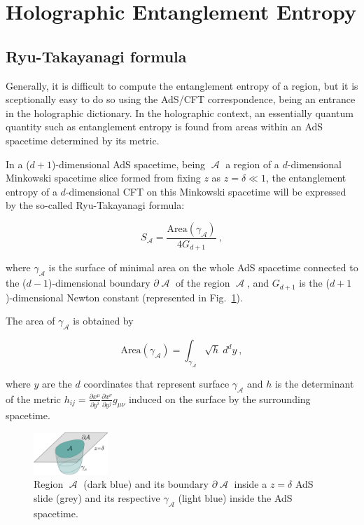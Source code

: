 \documentclass[twocolumn]{revtex4}
\providecommand{\eq}[2]{
    \begin{equation}
        #2
    \label{eq:#1}
    \end{equation}
}
\DeclareMathOperator{\calA}{\mathcal{A}}
\begin{document}
\section{Holographic Entanglement Entropy} \label{s:EE_Holo}


\subsection{Ryu-Takayanagi formula} \label{ss:R-T}

Generally, it is difficult to compute the entanglement entropy of a region, but it is sceptionally easy to do so using the AdS/CFT correspondence, being an entrance in the holographic dictionary. In the holographic context, an essentially quantum quantity such as entanglement entropy is found from areas within an AdS spacetime determined by its metric.

In a ($d+1$)-dimensional AdS spacetime, being $\calA$ a region of a $d$-dimensional Minkowski spacetime slice formed from fixing $z$ as $z=\delta \ll 1$, the entanglement entropy of a $d$-dimensional CFT on this Minkowski spacetime will be expressed by the so-called Ryu-Takayanagi formula:
\eq{EE_RT}{
    S_{\calA} = \frac{ \text{Area}(\gamma_{\calA}) }{ 4 G_{d+1} } \ ,
}
\cite{ryu_holographic_2008} where $\gamma_{\calA}$ is the surface of minimal area on the whole AdS spacetime connected to the ($d-1$)-dimensional boundary $\partial \calA$ of the region $\calA$, and $G_{d+1}$ is the ($d+1$)-dimensional Newton constant (represented in Fig.~\ref{fig:EE_AdS-CFT}).

The area of $\gamma_{\calA}$ is obtained by
\eq{EE_RT-area}{
    \text{Area}(\gamma_{\calA}) = \int_{\gamma_{\calA}} \sqrt{h} \ d^{d}y \ ,
}
where $y$ are the $d$ coordinates that represent surface $\gamma_{\calA}$ and $h$ is the determinant of the metric $h_{ij} = \frac{\partial x^\mu}{\partial y^i} \frac{\partial x^\nu}{\partial y^j} g_{\mu\nu}$ induced on the surface by the surrounding spacetime.

\begin{figure}
    \centering
    \includegraphics[width=0.25\textwidth]{../Imatges/EE_AdS-CFT.png}
\caption{Region $\calA$ (dark blue) and its boundary $\partial \calA$ inside a $z=\delta$ AdS slide (grey) and its respective $\gamma_{\calA}$ (light blue) inside the AdS spacetime.}
\label{fig:EE_AdS-CFT}
\end{figure}
\end{document}
